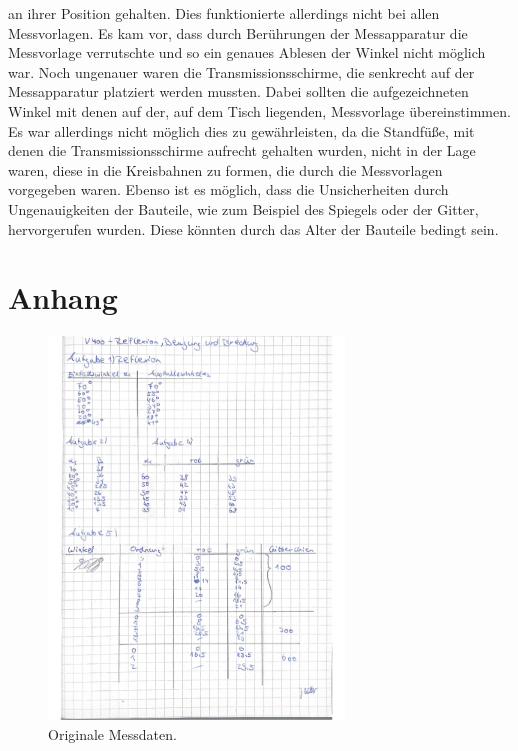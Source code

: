 an ihrer Position gehalten. Dies funktionierte allerdings nicht bei allen Messvorlagen. Es kam vor, dass durch Berührungen der Messapparatur die Messvorlage verrutschte und so
ein genaues Ablesen der Winkel nicht möglich war.
\newline
Noch ungenauer waren die Transmissionsschirme, die senkrecht auf der Messapparatur platziert werden mussten. Dabei sollten die aufgezeichneten Winkel mit denen auf der, auf dem
Tisch liegenden, Messvorlage übereinstimmen. Es war allerdings nicht möglich dies zu gewährleisten, da die Standfüße, mit denen die Transmissionsschirme aufrecht gehalten wurden,
nicht in der Lage waren, diese in die Kreisbahnen zu formen, die durch die Messvorlagen vorgegeben waren.
\newline
Ebenso ist es möglich, dass die Unsicherheiten durch Ungenauigkeiten der Bauteile, wie zum Beispiel des Spiegels oder der Gitter, hervorgerufen wurden. Diese könnten durch das
Alter der Bauteile bedingt sein.

\printbibliography{}

\section*{Anhang}
\label{sec:anhang}

\begin{figure}[H]
  \centering
  \includegraphics[width=0.7\textwidth]{data/origDaten.jpg}
  \caption{Originale Messdaten.}
  \label{fig:origDaten1}
\end{figure}